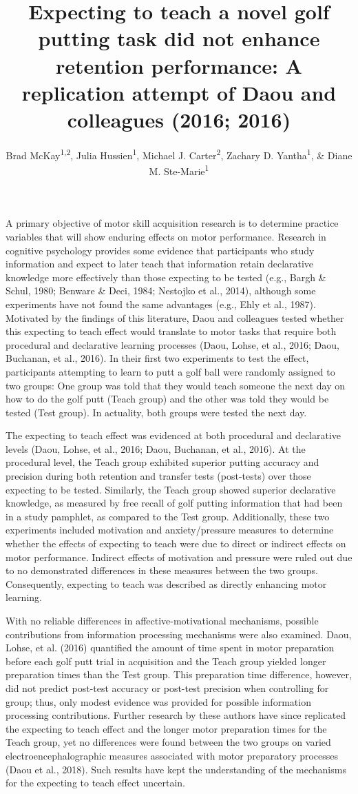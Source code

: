 \documentclass[
  english,
  man,floatsintext]{apa7}
\title{Expecting to teach a novel golf putting task did not enhance retention performance: A replication attempt of Daou and colleagues (2016; 2016)}
\author{Brad McKay\textsuperscript{1,2}, Julia Hussien\textsuperscript{1}, Michael J. Carter\textsuperscript{2}, Zachary D. Yantha\textsuperscript{1}, \& Diane M. Ste-Marie\textsuperscript{1}}
\date{}
\affiliation{\vspace{0.5cm}\textsuperscript{1} School of Human Kinetics, University of Ottawa\\\textsuperscript{2} Department of Kinesiology, McMaster University}
\begin{document}
\maketitle

A primary objective of motor skill acquisition research is to determine practice variables that will show enduring effects on motor performance. Research in cognitive psychology provides some evidence that participants who study information and expect to later teach that information retain declarative knowledge more effectively than those expecting to be tested (e.g., Bargh \& Schul, 1980; Benware \& Deci, 1984; Nestojko et al., 2014), although some experiments have not found the same advantages (e.g., Ehly et al., 1987). Motivated by the findings of this literature, Daou and colleagues tested whether this expecting to teach effect would translate to motor tasks that require both procedural and declarative learning processes (Daou, Lohse, et al., 2016; Daou, Buchanan, et al., 2016). In their first two experiments to test the effect, participants attempting to learn to putt a golf ball were randomly assigned to two groups: One group was told that they would teach someone the next day on how to do the golf putt (Teach group) and the other was told they would be tested (Test group). In actuality, both groups were tested the next day.

The expecting to teach effect was evidenced at both procedural and declarative levels (Daou, Lohse, et al., 2016; Daou, Buchanan, et al., 2016). At the procedural level, the Teach group exhibited superior putting accuracy and precision during both retention and transfer tests (post-tests) over those expecting to be tested. Similarly, the Teach group showed superior declarative knowledge, as measured by free recall of golf putting information that had been in a study pamphlet, as compared to the Test group. Additionally, these two experiments included motivation and anxiety/pressure measures to determine whether the effects of expecting to teach were due to direct or indirect effects on motor performance. Indirect effects of motivation and pressure were ruled out due to no demonstrated differences in these measures between the two groups. Consequently, expecting to teach was described as directly enhancing motor learning.

With no reliable differences in affective-motivational mechanisms, possible contributions from information processing mechanisms were also examined. Daou, Lohse, et al. (2016) quantified the amount of time spent in motor preparation before each golf putt trial in acquisition and the Teach group yielded longer preparation times than the Test group. This preparation time difference, however, did not predict post-test accuracy or post-test precision when controlling for group; thus, only modest evidence was provided for possible information processing contributions. Further research by these authors have since replicated the expecting to teach effect and the longer motor preparation times for the Teach group, yet no differences were found between the two groups on varied electroencephalographic measures associated with motor preparatory processes (Daou et al., 2018). Such results have kept the understanding of the mechanisms for the expecting to teach effect uncertain.
\end{document}
